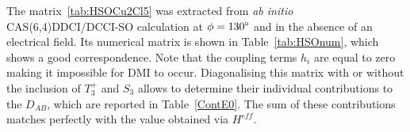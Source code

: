 \documentclass[12pt,a4paper]{report}
\numberwithin{equation}{section}
\begin{document}
\begin{table}[!ht]
    \centering
\caption{Numerical matrix of $\hat{H}^{SO}$ and electronic couplings in the uncoupled basis from a CAS(6,4)DDCI/DDCI-SO calculation with no electric field and $\phi=130\degree$.}
\label{tab:HSOnum}
\end{table}
The matrix~\ref{tab:HSOCu2Cl5} was extracted from \textit{ab initio} CAS(6,4)DDCI/DCCI-SO calculation at $\phi=130\degree$ and in the absence of an electrical field. Its numerical matrix is shown in Table~\ref{tab:HSOnum}, which shows a good correspondence. 
Note that the coupling terms $h_i$ are equal to zero making it impossible for DMI to occur.
Diagonalising this matrix with or without the inclusion of $T_3^+$ and $S_3$ allows to determine their individual contributions to the $D_{AB}$, which are reported in Table~\ref{ContE0}.
The sum of these contributions matches perfectly with the value obtained via $H^{eff}$.
\end{document}
